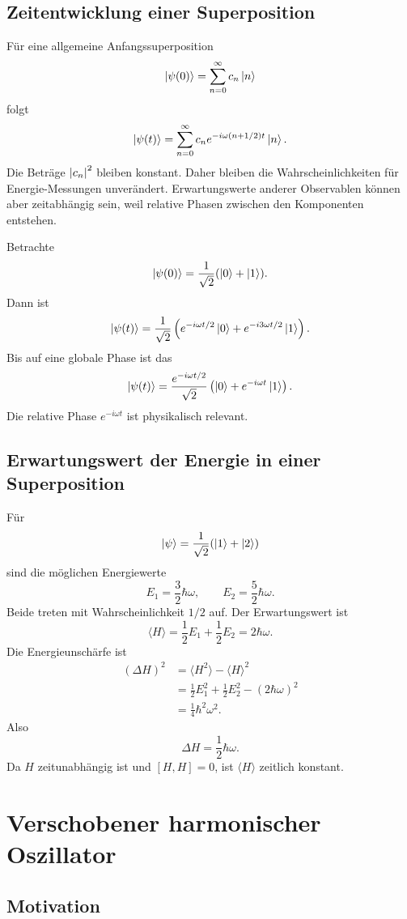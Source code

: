 \subsection{Zeitentwicklung einer Superposition}

Für eine allgemeine Anfangssuperposition
\[
    \left|\psi(0)\right\rangle=\sum_{n=0}^{\infty}c_n\left|n\right\rangle
\]
folgt
\[
    \left|\psi(t)\right\rangle=\sum_{n=0}^{\infty}c_n e^{-i\omega(n+1/2)t}\left|n\right\rangle.
\]
Die Beträge $\left| c_n \right|^2$ bleiben konstant. Daher bleiben die Wahrscheinlichkeiten für Energie-Messungen unverändert. Erwartungswerte anderer Observablen können aber zeitabhängig sein, weil relative Phasen zwischen den Komponenten entstehen.

\begin{examplebox}
Betrachte
\[
    \left|\psi(0)\right\rangle=\frac{1}{\sqrt2}(\left|0\right\rangle+\left|1\right\rangle).
\]
Dann ist
\[
    \left|\psi(t)\right\rangle=\frac{1}{\sqrt2}\left(e^{-i\omega t/2}\left|0\right\rangle+e^{-i3\omega t/2}\left|1\right\rangle\right).
\]
Bis auf eine globale Phase ist das
\[
    \left|\psi(t)\right\rangle=\frac{e^{-i\omega t/2}}{\sqrt2}\left(\left|0\right\rangle+e^{-i\omega t}\left|1\right\rangle\right).
\]
Die relative Phase $e^{-i\omega t}$ ist physikalisch relevant.
\end{examplebox}

\subsection{Erwartungswert der Energie in einer Superposition}

Für
\[
    \left|\psi\right\rangle=\frac{1}{\sqrt2}(\left|1\right\rangle+\left|2\right\rangle)
\]
sind die möglichen Energiewerte
\[
    E_1=\frac32\hbar\omega,
    \qquad
    E_2=\frac52\hbar\omega.
\]
Beide treten mit Wahrscheinlichkeit $1/2$ auf. Der Erwartungswert ist
\[
    \langle H\rangle=\frac12E_1+\frac12E_2=2\hbar\omega.
\]
Die Energieunschärfe ist
\begin{align*}
    (\Delta H)^2
    &=\langle H^2\rangle-\langle H\rangle^2 \\
    &=\frac12E_1^2+\frac12E_2^2-(2\hbar\omega)^2 \\
    &=\frac14\hbar^2\omega^2.
\end{align*}
Also
\[
    \Delta H=\frac12\hbar\omega.
\]
Da $H$ zeitunabhängig ist und $[H,H]=0$, ist $\langle H\rangle$ zeitlich konstant.

\section{Verschobener harmonischer Oszillator}

\subsection{Motivation}

